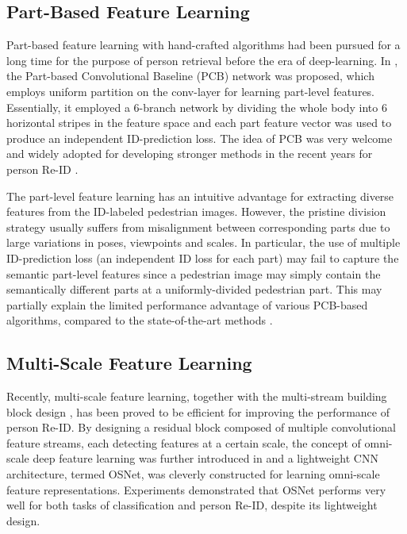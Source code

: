 \documentclass[journal]{IEEEtran}
\begin{document}
\subsection{Part-Based Feature Learning}
Part-based feature learning with hand-crafted algorithms had been pursued for a long time for the purpose of person retrieval before the era of deep-learning. In \cite{sun2018beyond}, the Part-based Convolutional Baseline (PCB) network was proposed, which employs uniform partition on the conv-layer for learning part-level features. Essentially, it employed a 6-branch network by dividing the whole body into 6 horizontal stripes in the feature space and each part feature vector was used to produce an independent ID-prediction loss. The idea of PCB was very welcome and widely adopted for developing stronger methods in the recent years for person Re-ID \cite{zheng2019pyramid}\cite{quan2019Auto}\cite{wang2018MGN}.

The part-level feature learning has an intuitive advantage for extracting diverse features from the ID-labeled pedestrian images. However, the pristine division strategy usually suffers from misalignment \cite{zhang2020Part} between corresponding parts due to large variations in poses, viewpoints and scales. In particular, the use of multiple ID-prediction loss (an independent ID loss for each part) may fail to capture the semantic part-level features since a pedestrian image may simply contain the semantically different parts at a uniformly-divided pedestrian part. This may partially explain the limited performance advantage of various PCB-based algorithms, compared to the state-of-the-art methods \cite{xia2019SONA,chen2019MHN}.

\subsection{Multi-Scale Feature Learning}
Recently, multi-scale feature learning, together with the multi-stream building block design \cite{chang2018MFN,qian2017mulscale,chen2018person}, has been proved to be efficient for improving the performance of person Re-ID. By designing a residual block composed of multiple convolutional feature streams, each detecting features at a certain scale, the concept of omni-scale deep feature learning was further introduced in \cite{zhou2019OSNet} and a lightweight CNN architecture, termed OSNet, was cleverly constructed for learning omni-scale feature representations. Experiments demonstrated that OSNet performs very well for both tasks of classification and person Re-ID, despite its lightweight design.
\end{document}
